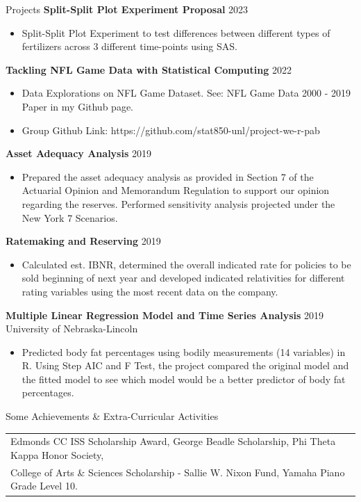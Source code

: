 \documentclass{resume} %
\begin{document}
\begin{rSection}{Projects}
\textbf{Split-Split Plot Experiment Proposal} \hfill 2023
 \begin{itemize}
    \itemsep -1pt {}
  \item Split-Split Plot Experiment to test differences between different types of fertilizers
  across 3 different time-points using SAS.
 \end{itemize}
\textbf{Tackling NFL Game Data with Statistical Computing} \hfill 2022
 \begin{itemize}
     \itemsep -1pt {}
   \item Data Explorations on NFL Game Dataset. See: NFL Game Data 2000 - 2019 Paper in my Github page.
   \item Group Github Link: https://github.com/stat850-unl/project-we-r-pab
  \end{itemize}
\textbf{Asset Adequacy Analysis} \hfill 2019
  \begin{itemize}
    \itemsep -1pt {}
     \item Prepared the asset adequacy analysis as provided in Section 7 of the Actuarial Opinion and
      Memorandum Regulation to support our opinion regarding the reserves. Performed sensitivity
    analysis projected under the New York 7 Scenarios.
  \end{itemize}
\textbf{Ratemaking and Reserving} \hfill 2019
     \begin{itemize}
       \itemsep -1pt {}
       \item Calculated est. IBNR, determined the overall indicated rate for policies to be sold beginning of next year
       and developed indicated relativities for different rating variables using the most recent data on the company.
     \end{itemize}
\textbf{Multiple Linear Regression Model and Time Series Analysis} \hfill 2019\\
  University of Nebraska-Lincoln
    \begin{itemize}
      \itemsep -1pt {}
       \item Predicted body fat percentages using bodily measurements (14 variables) in R.
       Using Step AIC and F Test, the project compared the original model and the fitted model to see which model would be a better predictor of body fat percentages.
       \end{itemize}
\end{rSection}
\newpage

\begin{rSection}{Some Achievements \& Extra-Curricular Activities}
\begin{tabular}{@{\hspace{6ex}} l }
Edmonds CC ISS Scholarship Award, George Beadle Scholarship, Phi Theta Kappa Honor Society,\\
College of Arts \& Sciences Scholarship - Sallie W. Nixon Fund, Yamaha Piano Grade Level 10.
\end{tabular}
\end{rSection}
\end{document}
